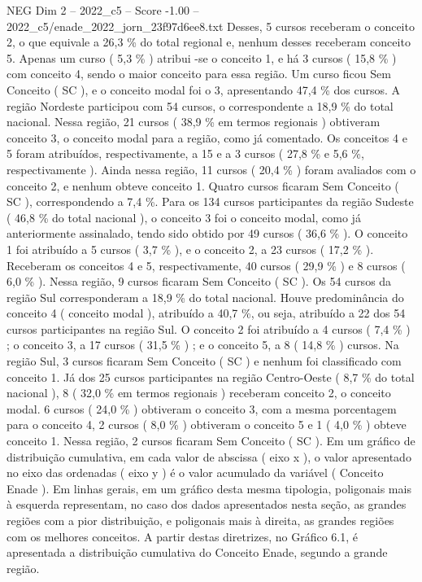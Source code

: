 \begin{textsample}{NEG Dim 2 – 2022\_c5 – Score -1.00 – 2022\_c5/enade\_2022\_jorn\_23f97d6ee8.txt}
Desses, 5 cursos receberam o conceito 2, o que equivale a 26,3 \% do total regional e, nenhum desses receberam conceito 5.
Apenas um curso ( 5,3 \% ) atribui -se o conceito 1, e há 3 cursos ( 15,8 \% ) com conceito 4, sendo o maior conceito para essa região.
Um curso ficou Sem Conceito ( SC ), e o conceito modal foi o 3, apresentando 47,4 \% dos cursos.
A região Nordeste participou com 54 cursos, o correspondente a 18,9 \% do total nacional.
Nessa região, 21 cursos ( 38,9 \% em termos regionais ) obtiveram conceito 3, o conceito modal para a região, como já comentado.
Os conceitos 4 e 5 foram atribuídos, respectivamente, a 15 e a 3 cursos ( 27,8 \% e 5,6 \%, respectivamente ).
Ainda nessa região, 11 cursos ( 20,4 \% ) foram avaliados com o conceito 2, e nenhum obteve conceito 1.
Quatro cursos ficaram Sem Conceito ( SC ), correspondendo a 7,4 \%.
Para os 134 cursos participantes da região Sudeste ( 46,8 \% do total nacional ), o conceito 3 foi o conceito modal, como já anteriormente assinalado, tendo sido obtido por 49 cursos ( 36,6 \% ).
O conceito 1 foi atribuído a 5 cursos ( 3,7 \% ), e o conceito 2, a 23 cursos ( 17,2 \% ).
Receberam os conceitos 4 e 5, respectivamente, 40 cursos ( 29,9 \% ) e 8 cursos ( 6,0 \% ).
Nessa região, 9 cursos ficaram Sem Conceito ( SC ).
Os 54 cursos da região Sul corresponderam a 18,9 \% do total nacional.
Houve predominância do conceito 4 ( conceito modal ), atribuído a 40,7 \%, ou seja, atribuído a 22 dos 54 cursos participantes na região Sul.
O conceito 2 foi atribuído a 4 cursos ( 7,4 \% ) ; o conceito 3, a 17 cursos ( 31,5 \% ) ; e o conceito 5, a 8 ( 14,8 \% ) cursos.
Na região Sul, 3 cursos ficaram Sem Conceito ( SC ) e nenhum foi classificado com conceito 1.
Já dos 25 cursos participantes na região Centro-Oeste ( 8,7 \% do total nacional ), 8 ( 32,0 \% em termos regionais ) receberam conceito 2, o conceito modal. 6 cursos ( 24,0 \% ) obtiveram o conceito 3, com a mesma porcentagem para o conceito 4, 2 cursos ( 8,0 \% ) obtiveram o conceito 5 e 1 ( 4,0 \% ) obteve conceito 1.
Nessa região, 2 cursos ficaram Sem Conceito ( SC ).
Em um gráfico de distribuição cumulativa, em cada valor de abscissa ( eixo x ), o valor apresentado no eixo das ordenadas ( eixo y ) é o valor acumulado da variável ( Conceito Enade ).
Em linhas gerais, em um gráfico desta mesma tipologia, poligonais mais à esquerda representam, no caso dos dados apresentados nesta seção, as grandes regiões com a pior distribuição, e poligonais mais à direita, as grandes regiões com os melhores conceitos.
A partir destas diretrizes, no Gráfico 6.1, é apresentada a distribuição cumulativa do Conceito Enade, segundo a grande região.

\end{textsample}
